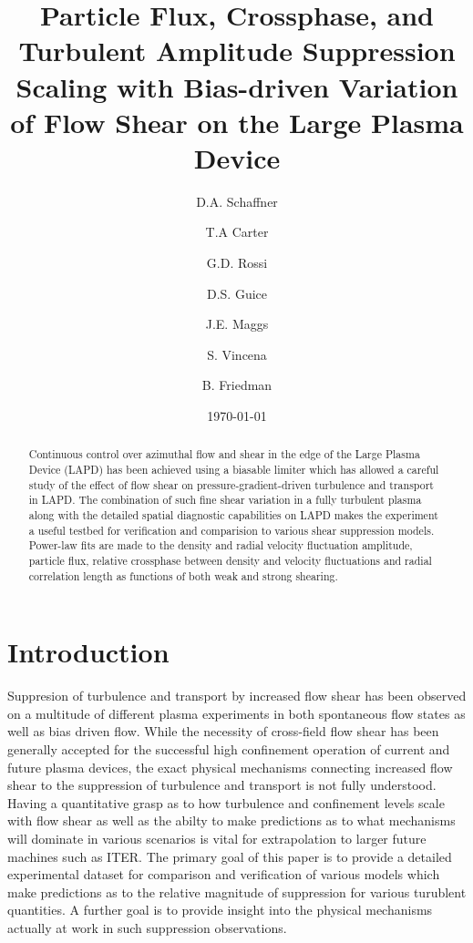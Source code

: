 \documentclass[aip,pop,amsmath,amssymb,reprint,superscriptaddress]{revtex4-1} %
\begin{document}
\title{Particle Flux, Crossphase, and Turbulent Amplitude Suppression Scaling with Bias-driven Variation of Flow Shear on the Large Plasma Device}
\author{D.A. Schaffner}
\author{T.A Carter}
\author{G.D. Rossi}
\author{D.S. Guice}
\author{J.E. Maggs}
\author{S. Vincena}
\author{B. Friedman}
\date{\today}
\begin{abstract}
Continuous control over azimuthal flow and shear in the edge of the Large Plasma Device (LAPD) has been achieved using a biasable limiter which has allowed a careful study of the effect of flow shear on pressure-gradient-driven turbulence and transport in LAPD. The combination of such fine shear variation in a fully turbulent plasma along with the detailed spatial diagnostic capabilities on LAPD makes the experiment a useful testbed for verification and comparision to various shear suppression models. Power-law fits are made to the density and radial velocity fluctuation amplitude, particle flux, relative crossphase between density and velocity fluctuations and radial correlation length as functions of both weak and strong shearing. 
\end{abstract}
\maketitle

\section{Introduction}

Suppresion of turbulence and transport by increased flow shear has been observed on a multitude of different plasma experiments in both spontaneous flow states as well as bias driven flow. While the necessity of cross-field flow shear has been generally accepted for the successful high confinement operation of current and future plasma devices, the exact physical mechanisms connecting increased flow shear to the suppression of turbulence and transport is not fully understood. Having a quantitative grasp as to how turbulence and confinement levels scale with flow shear as well as the abilty to make predictions as to what mechanisms will dominate in various scenarios is vital for extrapolation to larger future machines such as ITER. The primary goal of this paper is to provide a detailed experimental dataset for comparison and verification of various models which make predictions as to the relative magnitude of suppression for various turublent quantities. A further goal is to provide insight into the physical mechanisms actually at work in such suppression observations.
\end{document}
